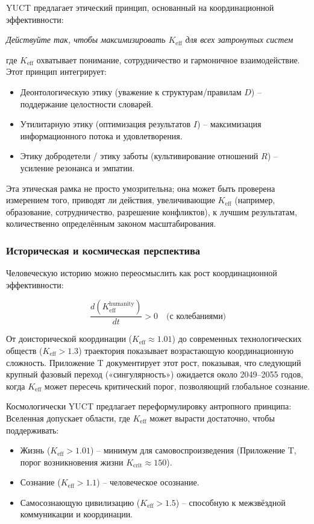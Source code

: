 \documentclass[12pt,a4paper]{article}
\newcommand{\eff}{\mathrm{eff}}
\newcommand{\Ke}{K_{\eff}}
\newcommand{\Kcrit}{K_{\mathrm{crit}}}
\begin{document}
	YUCT предлагает этический принцип, основанный на координационной эффективности:
	
	\begin{center}
		\textit{Действуйте так, чтобы максимизировать $\Ke$ для всех затронутых систем}
	\end{center}
	
	где $\Ke$ охватывает понимание, сотрудничество и гармоничное взаимодействие. Этот принцип интегрирует:
	\begin{itemize}
		\item Деонтологическую этику (уважение к структурам/правилам $D$) – поддержание целостности словарей.
		\item Утилитарную этику (оптимизация результатов $I$) – максимизация информационного потока и удовлетворения.
		\item Этику добродетели / этику заботы (культивирование отношений $R$) – усиление резонанса и эмпатии.
	\end{itemize}
	
	Эта этическая рамка не просто умозрительна; она может быть проверена измерением того, приводят ли действия, увеличивающие $\Ke$ (например, образование, сотрудничество, разрешение конфликтов), к лучшим результатам, количественно определённым законом масштабирования.
	
	\subsubsection{Историческая и космическая перспектива}
	
	Человеческую историю можно переосмыслить как рост координационной эффективности:
	
	\[
	\frac{d(\Ke^{\text{humanity}})}{dt} > 0 \quad \text{(с колебаниями)}
	\]
	
	От доисторической координации ($\Ke \approx 1.01$) до современных технологических обществ ($\Ke > 1.3$) траектория показывает возрастающую координационную сложность. Приложение T документирует этот рост, показывая, что следующий крупный фазовый переход («сингулярность») ожидается около 2049–2055 годов, когда $\Ke$ может пересечь критический порог, позволяющий глобальное сознание.
	
	Космологически YUCT предлагает переформулировку антропного принципа: Вселенная допускает области, где $\Ke$ может вырасти достаточно, чтобы поддерживать:
	\begin{itemize}
		\item Жизнь ($\Ke > 1.01$) – минимум для самовоспроизведения (Приложение T, порог возникновения жизни $\Kcrit \approx 150$).
		\item Сознание ($\Ke > 1.1$) – человеческое осознание.
		\item Самосознающую цивилизацию ($\Ke > 1.5$) – способную к межзвёздной коммуникации и координации.
	\end{itemize}
	
\end{document}
